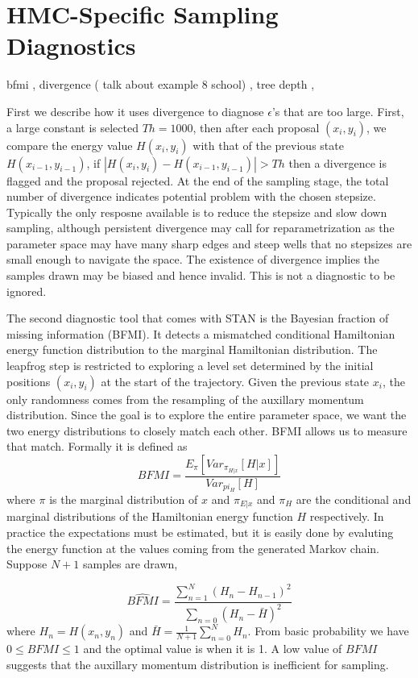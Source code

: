 \documentclass[]{report}
\begin{document}
\section{HMC-Specific Sampling Diagnostics}
bfmi , divergence ( talk about example 8 school) , tree depth ,

First we describe how it uses
divergence to diagnose $\epsilon$'s that are too large. First, a large constant
is selected $Th = 1000$, then after each proposal $(x_i,y_i)$, we compare the
energy value $H(x_i,y_i)$ with that of the previous state $H(x_{i-1},y_{i-1})$,
if $|H(x_i,y_i) - H(x_{i-1},y_{i-1})|> Th$ then a divergence is flagged and the
proposal rejected. At the end of the sampling stage, the total number of
divergence indicates potential problem with the chosen stepsize. Typically the
only resposne available is to reduce the stepsize and slow down sampling,
although persistent divergence may call for reparametrization as the parameter
space may have many sharp edges and steep wells that no stepsizes are small
enough to navigate the space. The existence of divergence implies the samples
drawn may be biased and hence invalid. This is not a diagnostic to be ignored.

The second diagnostic tool that comes with STAN is the Bayesian fraction of
missing information (BFMI). It detects a mismatched conditional Hamiltonian
energy function
distribution to the marginal Hamiltonian distribution. The leapfrog step is
restricted to exploring a level set determined by the 
initial positions $(x_i,y_i)$ at the start of the trajectory. Given the previous
state $x_i$, the only randomness comes from the resampling of the auxillary
momentum distribution. Since the goal is
to explore the entire parameter space, we want the two energy distributions to
closely match each other. BFMI allows us to measure that match. Formally it is defined as 
\[ BFMI = \frac{ E_\pi[Var_{\pi_{H|x}}[H|x]]}{Var_{pi_H}[H]} \]
where $\pi$ is the marginal distribution of $x$ and $\pi_{E|x}$ and $\pi_{H}$
are the conditional and marginal distributions of the Hamiltonian energy
function $H$ respectively. In practice the expectations must be estimated, but
it is easily done by evaluting the energy function at the values coming from the
generated Markov chain. Suppose $N+1$ samples are drawn, 

\[ \hat{BFMI} = \frac{\sum_{n=1}^N(H_n-H_{n-1})^2}{\sum_{n=0}(H_n-\bar{H})^2} \]
where $H_n = H(x_n,y_n)$ and $\bar{H}=\frac{1}{N+1}\sum_{n=0}^N H_n$. From basic
probability we have $0 \le BFMI \le 1 $ and the optimal value is when it is
1. A low value of $BFMI$ suggests that the auxillary momentum distribution is
inefficient for sampling. 
\end{document}
